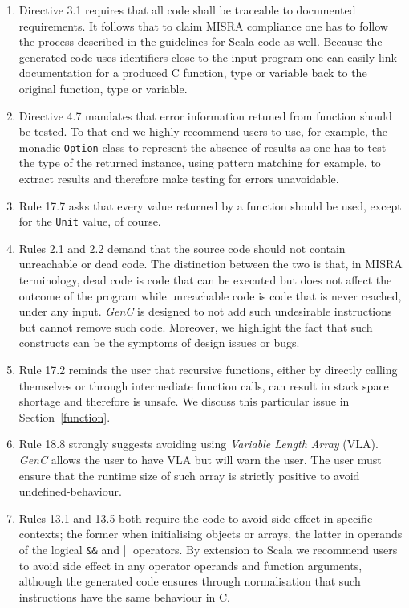 \documentclass[a4paper,twoside]{article}
\newcommand{\InlineC}[1]{\lstinline[language=C99]|#1|}
\newcommand{\InlineS}[1]{\lstinline[language=Leon]|#1|}
\newcommand{\GenC}{\emph{GenC}\xspace}
\newcommand{\RefSec}[1]{Section~\ref{#1}}
\begin{document}
\begin{enumerate}

\item Directive 3.1 requires that all code shall be traceable to documented
requirements. It follows that to claim MISRA compliance one has to follow the
process described in the guidelines for Scala code as well. Because the
generated code uses identifiers close to the input program one can easily link
documentation for a produced C function, type or variable back to the original
function, type or variable.

\item Directive 4.7 mandates that error information retuned from function should
be tested. To that end we highly recommend users to use, for example, the monadic
\InlineS{Option} class to represent the absence of results as one has to test
the type of the returned instance, using pattern matching for example, to
extract results and therefore make testing for errors unavoidable.

\item Rule 17.7 asks that every value returned by a function should be used,
except for the \InlineS{Unit} value, of course.

\item Rules 2.1 and 2.2 demand that the source code should not contain
unreachable or dead code. The distinction between the two is that, in MISRA
terminology, dead code is code that can be executed but does not affect the
outcome of the program while unreachable code is code that is never reached,
under any input. \GenC is designed to not add such undesirable instructions but
cannot remove such code. Moreover, we highlight the fact that such constructs
can be the symptoms of design issues or bugs.

\item Rule 17.2 reminds the user that recursive functions, either by directly
calling themselves or through intermediate function calls, can result in stack
space shortage and therefore is unsafe. We discuss this particular issue in
\RefSec{function}.

\item Rule 18.8 strongly suggests avoiding using \emph{Variable Length Array}
(VLA). \GenC allows the user to have VLA but will warn the user. The user must
ensure that the runtime size of such array is strictly positive to avoid
undefined-behaviour.

\item Rules 13.1 and 13.5 both require the code to avoid side-effect in specific
contexts; the former when initialising objects or arrays, the latter in operands
of the logical \InlineC{&&} and \InlineC{||} operators. By extension to Scala we
recommend users to avoid side effect in any operator operands and function
arguments, although the generated code ensures through normalisation that such
instructions have the same behaviour in C.


\end{enumerate}
\end{document}
